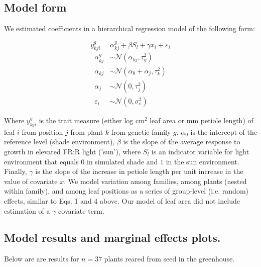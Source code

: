 \documentclass[11pt, oneside]{amsart}
\begin{document}
\subsection{Model form}
We estimated coefficients in a hierarchical regression model of the following form:

\begin{equation} \label{eq5}
y^{g}_{kji} = \alpha^{g}_{kj} + \beta S_{l} + \gamma x_{i} + \varepsilon_{i}
\end{equation}
\begin{align*}
\alpha^{g}_{kj} &\sim \mathcal{N}(\alpha_{kj}, \tau^{2}_{g})\\
\alpha_{kj} &\sim \mathcal{N}(\alpha_0 + \alpha_{j}, \tau^2_{k}) \\
\alpha_{j} &\sim \mathcal{N}(0, \tau^2_{j}) \\
\varepsilon_{i} &\sim \mathcal{N}(0, \sigma^{2}_{e})
\end{align*}

Where $y^{g}_{kji}$ is the trait measure (either log cm$^2$ leaf area or mm petiole length) of leaf $i$ from position $j$ from plant $k$ from genetic family $g$. $\alpha_0$ is the intercept of the reference level (shade environment), $\beta$ is the slope of the average response to growth in elevated FR:R light ('sun'), where $S_{l}$ is an indicator variable for light environment that equals $0$ in simulated shade and $1$ in the sun environment. Finally, $\gamma$ is the slope of the increase in petiole length per unit increase in the value of covariate $x$. We model variation among families, among plants (nested within family), and among leaf positions as a series of group-level (i.e. random) effects, similar to Eqs. 1 and 4 above. Our model of leaf area did not include estimation of a $\gamma$ covariate term.

\subsection{Model results and marginal effects plots.}
Below are are results for $n=37$ plants reared from seed in the greenhouse.

\vspace{1cm}
\end{document}
